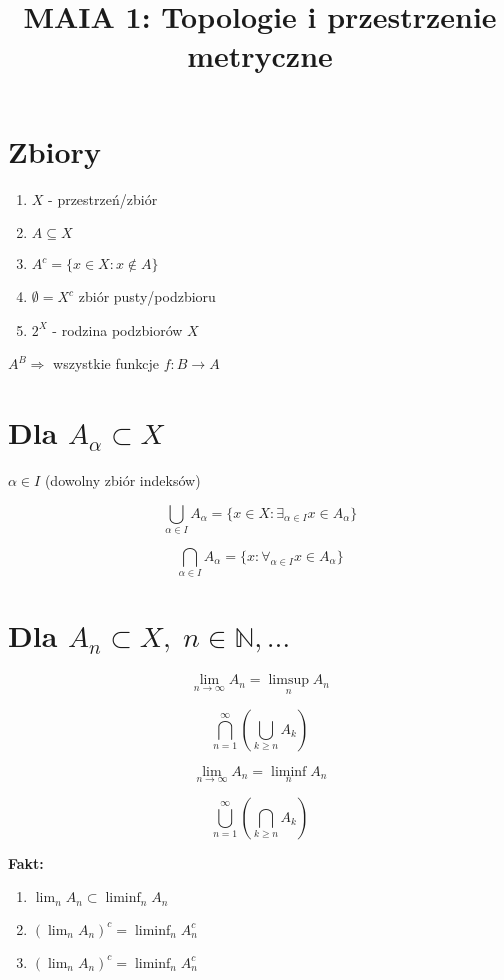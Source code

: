 \documentclass{article}
\title{MAIA 1: Topologie i przestrzenie metryczne}
\author{}
\date{}
\begin{document}
\maketitle

\section{Zbiory}
\begin{enumerate}
\item $X$ - przestrzeń/zbiór
\item $A \subseteq X$
\item $A^c = \{x \in X : x \notin A\}$
\item $\emptyset = X^c$ \quad zbiór pusty/podzbioru
\item $2^X$ - rodzina podzbiorów $X$
\end{enumerate}

$A^B \Rightarrow$ wszystkie funkcje $f: B \to A$

\section{Dla $A_\alpha \subset X$}
$\alpha \in I$ (dowolny zbiór indeksów)

$$\bigcup_{\alpha \in I} A_\alpha = \{x \in X: \exists_{\alpha \in I} x \in A_\alpha\}$$

$$\bigcap_{\alpha \in I} A_\alpha = \{x: \forall_{\alpha \in I} x \in A_\alpha\}$$

\section{Dla $A_n \subset X, \; n \in \mathbb{N}, \ldots$}
$$\lim_{n \to \infty} A_n = \limsup_{n} A_n$$

\begin{equation*}
\bigcap_{n=1}^{\infty} \left( \bigcup_{k \geq n} A_k \right)
\end{equation*}

$$\lim_{n \to \infty} A_n = \liminf_{n} A_n$$

\begin{equation*}
\bigcup_{n=1}^{\infty} \left( \bigcap_{k \geq n} A_k \right)
\end{equation*}

\vspace{0.3cm}
\textbf{Fakt:}
\begin{enumerate}
\item $\lim_{n} A_n \subset \liminf_{n} A_n$
\item $\left( \lim_{n} A_n \right)^c = \liminf_{n} A_n^c$
\item $\left( \lim_{n} A_n \right)^c = \liminf_{n} A_n^c$
\end{enumerate}
\end{document}
